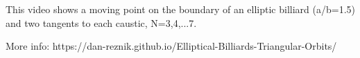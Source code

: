 This video shows a moving point on the boundary of an elliptic billiard (a/b=1.5) and two tangents to each caustic, N=3,4,...7.

More info: https://dan-reznik.github.io/Elliptical-Billiards-Triangular-Orbits/